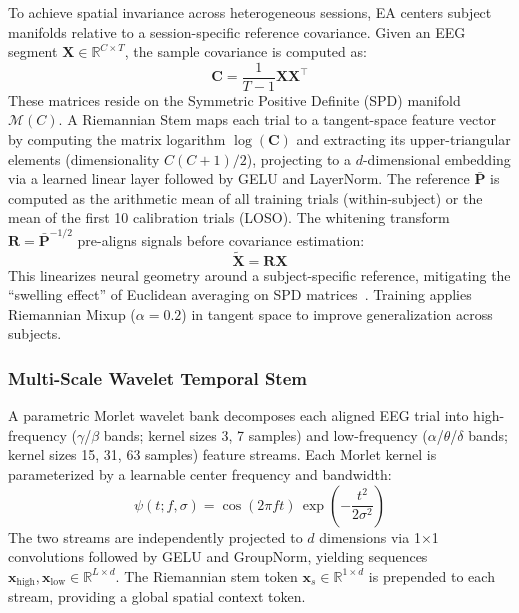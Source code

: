 \documentclass[11pt,a4paper]{article}
\begin{document}
To achieve spatial invariance across heterogeneous sessions, EA centers subject
manifolds relative to a session-specific reference covariance.
Given an EEG segment $\mathbf{X} \in \mathbb{R}^{C \times T}$, the
sample covariance is computed as:
\begin{equation}
    \mathbf{C} = \frac{1}{T-1} \mathbf{X}\mathbf{X}^\top
\end{equation}
These matrices reside on the Symmetric Positive Definite (SPD) manifold
$\mathcal{M}(C)$.
A Riemannian Stem maps each trial to a tangent-space feature vector by
computing the matrix logarithm $\log(\mathbf{C})$ and extracting its
upper-triangular elements (dimensionality $C(C+1)/2$), projecting to a
$d$-dimensional embedding via a learned linear layer followed by GELU and
LayerNorm.
The reference $\bar{\mathbf{P}}$ is computed as the arithmetic mean of all
training trials (within-subject) or the mean of the first 10 calibration trials
(LOSO).
The whitening transform $\mathbf{R} = \bar{\mathbf{P}}^{-1/2}$ pre-aligns
signals before covariance estimation:
\begin{equation}
    \tilde{\mathbf{X}} = \mathbf{R} \mathbf{X}
\end{equation}
This linearizes neural geometry around a subject-specific reference, mitigating
the ``swelling effect'' of Euclidean averaging on SPD
matrices~\cite{Barachant2010}.
Training applies Riemannian Mixup ($\alpha=0.2$) in tangent space to improve
generalization across subjects.

\subsubsection{Multi-Scale Wavelet Temporal Stem}

A parametric Morlet wavelet bank decomposes each aligned EEG trial into
high-frequency ($\gamma$/$\beta$ bands; kernel sizes 3, 7 samples) and
low-frequency ($\alpha$/$\theta$/$\delta$ bands; kernel sizes 15, 31, 63
samples) feature streams.
Each Morlet kernel is parameterized by a learnable center frequency and
bandwidth:
\begin{equation}
    \psi(t; f, \sigma) = \cos(2\pi f t)\,
    \exp\!\left(-\frac{t^2}{2\sigma^2}\right)
\end{equation}
The two streams are independently projected to $d$ dimensions via 1$\times$1
convolutions followed by GELU and GroupNorm, yielding sequences
$\mathbf{x}_\text{high}, \mathbf{x}_\text{low} \in \mathbb{R}^{L \times d}$.
The Riemannian stem token $\mathbf{x}_s \in \mathbb{R}^{1 \times d}$ is
prepended to each stream, providing a global spatial context token.
\end{document}
